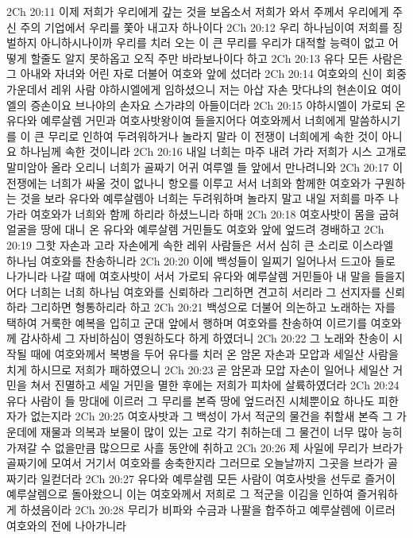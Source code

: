 2Ch 20:11  이제 저희가 우리에게 갚는 것을 보옵소서 저희가 와서 주께서 우리에게 주신 주의 기업에서 우리를 쫓아 내고자 하나이다
2Ch 20:12  우리 하나님이여 저희를 징벌하지 아니하시나이까 우리를 치러 오는 이 큰 무리를 우리가 대적할 능력이 없고 어떻게 할줄도 알지 못하옵고 오직 주만 바라보나이다 하고
2Ch 20:13  유다 모든 사람은 그 아내와 자녀와 어린 자로 더불어 여호와 앞에 섰더라
2Ch 20:14  여호와의 신이 회중 가운데서 레위 사람 야하시엘에게 임하셨으니 저는 아삽 자손 맛다냐의 현손이요 여이엘의 증손이요 브나야의 손자요 스가랴의 아들이더라
2Ch 20:15  야하시엘이 가로되 온 유다와 예루살렘 거민과 여호사밧왕이여 들을지어다 여호와께서 너희에게 말씀하시기를 이 큰 무리로 인하여 두려워하거나 놀라지 말라 이 전쟁이 너희에게 속한 것이 아니요 하나님께 속한 것이니라
2Ch 20:16  내일 너희는 마주 내려 가라 저희가 시스 고개로 말미암아 올라 오리니 너희가 골짜기 어귀 여루엘 들 앞에서 만나려니와
2Ch 20:17  이 전쟁에는 너희가 싸울 것이 없나니 항오를 이루고 서서 너희와 함께한 여호와가 구원하는 것을 보라 유다와 예루살렘아 너희는 두려워하며 놀라지 말고 내일 저희를 마주 나가라 여호와가 너희와 함께 하리라 하셨느니라 하매
2Ch 20:18  여호사밧이 몸을 굽혀 얼굴을 땅에 대니 온 유다와 예루살렘 거민들도 여호와 앞에 엎드려 경배하고
2Ch 20:19  그핫 자손과 고라 자손에게 속한 레위 사람들은 서서 심히 큰 소리로 이스라엘 하나님 여호와를 찬송하니라
2Ch 20:20  이에 백성들이 일찌기 일어나서 드고아 들로 나가니라 나갈 때에 여호사밧이 서서 가로되 유다와 예루살렘 거민들아 내 말을 들을지어다 너희는 너희 하나님 여호와를 신뢰하라 그리하면 견고히 서리라 그 선지자를 신뢰하라 그리하면 형통하리라 하고
2Ch 20:21  백성으로 더불어 의논하고 노래하는 자를 택하여 거룩한 예복을 입히고 군대 앞에서 행하며 여호와를 찬송하여 이르기를 여호와께 감사하세 그 자비하심이 영원하도다 하게 하였더니
2Ch 20:22  그 노래와 찬송이 시작될 때에 여호와께서 복병을 두어 유다를 치러 온 암몬 자손과 모압과 세일산 사람을 치게 하시므로 저희가 패하였으니
2Ch 20:23  곧 암몬과 모압 자손이 일어나 세일산 거민을 쳐서 진멸하고 세일 거민을 멸한 후에는 저희가 피차에 살륙하였더라
2Ch 20:24  유다 사람이 들 망대에 이르러 그 무리를 본즉 땅에 엎드러진 시체뿐이요 하나도 피한 자가 없는지라
2Ch 20:25  여호사밧과 그 백성이 가서 적군의 물건을 취할새 본즉 그 가운데에 재물과 의복과 보물이 많이 있는 고로 각기 취하는데 그 물건이 너무 많아 능히 가져갈 수 없을만큼 많으므로 사흘 동안에 취하고
2Ch 20:26  제 사일에 무리가 브라가 골짜기에 모여서 거기서 여호와를 송축한지라 그러므로 오늘날까지 그곳을 브라가 골짜기라 일컫더라
2Ch 20:27  유다와 예루살렘 모든 사람이 여호사밧을 선두로 즐거이 예루살렘으로 돌아왔으니 이는 여호와께서 저희로 그 적군을 이김을 인하여 즐거워하게 하셨음이라
2Ch 20:28  무리가 비파와 수금과 나팔을 합주하고 예루살렘에 이르러 여호와의 전에 나아가니라
